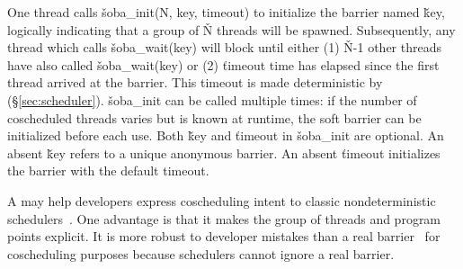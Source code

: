 \noindent
One thread calls \v{soba\_init(N, key, timeout)} to initialize the barrier
named \v{key}, logically indicating that a group of \v{N} threads will
be spawned.  Subsequently, any thread which calls \v{soba\_wait(key)}
will block until either (1) \v{N}-1 other threads have also called
\v{soba\_wait(key)} or (2) \v{timeout} time has elapsed since the first
thread arrived at the barrier.  This timeout is made deterministic by \xxx
(\S\ref{sec:scheduler}).  \v{soba\_init} can be called multiple
times: if the number of coscheduled threads varies but is known at runtime,
the soft barrier can be initialized before each use.  Both \v{key} and
\v{timeout} in \v{soba\_init} are optional.  An absent \v{key} refers to a
unique anonymous barrier.  An absent \v{timeout} initializes the barrier
with the default timeout.

A \compute may help developers express coscheduling intent to classic
nondeterministic schedulers~\cite{coschedule}.  One advantage is that it
makes the group of threads and program points explicit.  It is more robust
to developer mistakes than a real barrier~\cite{coschedule:sigmetrics96}
for coscheduling purposes because schedulers cannot ignore a real barrier.




